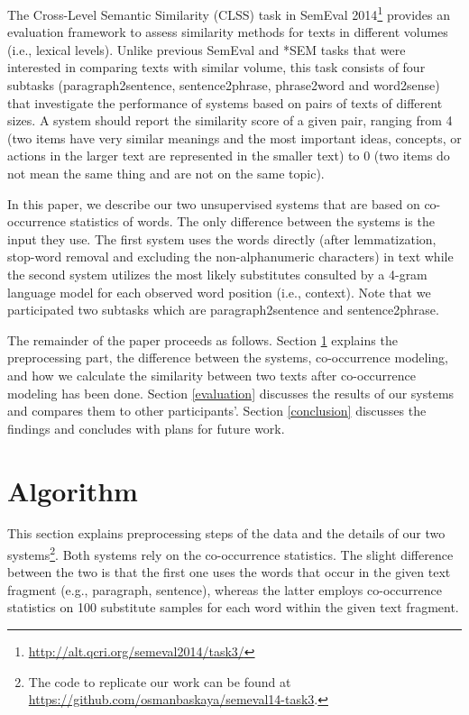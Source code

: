 \documentclass[11pt]{article}
\begin{document}
The Cross-Level Semantic Similarity (CLSS) task in SemEval 2014\footnote{\url{http://alt.qcri.org/semeval2014/task3/}} \cite{jurgens14task3} provides an evaluation framework to assess similarity methods for texts in different volumes (i.e., lexical levels). Unlike previous SemEval and *SEM tasks that were interested in comparing texts with similar volume, this task consists of four subtasks (paragraph2sentence, sentence2phrase, phrase2word and word2sense) that investigate the performance of systems based on pairs of texts of different sizes. A system should report the similarity score of a given pair, ranging from 4 (two items have very similar meanings and the most important ideas, concepts, or actions in the larger text are represented in the smaller text) to 0 (two items do not mean the same thing and are not on the same topic).

In this paper, we describe our two unsupervised systems that are based on co-occurrence statistics of words. The only difference between the systems is the input they use. The first system uses the words directly (after lemmatization, stop-word removal and excluding the non-alphanumeric characters) in text while the second system utilizes the most likely substitutes consulted by a 4-gram language model for each observed word position (i.e., context). Note that we participated two subtasks which are paragraph2sentence and sentence2phrase.


The remainder of the paper proceeds as follows. Section \ref{algorithm} explains the preprocessing part, the difference between the systems, co-occurrence modeling, and how we calculate the similarity between two texts after co-occurrence modeling has been done. Section \ref{evaluation} discusses the results of our systems and compares them to other participants'. Section \ref{conclusion} discusses the findings and concludes with plans for future work.

\section{Algorithm}
\label{algorithm}
This section explains preprocessing steps of the data and the details of our two systems\footnote{The code to replicate our work can be found at \url{https://github.com/osmanbaskaya/semeval14-task3}.}. Both systems rely on the co-occurrence statistics. The slight difference between the two is that the first one uses the words that occur in the given text fragment (e.g., paragraph, sentence), whereas the latter employs co-occurrence statistics on 100 substitute samples for each word within the given text fragment. 
\end{document}
